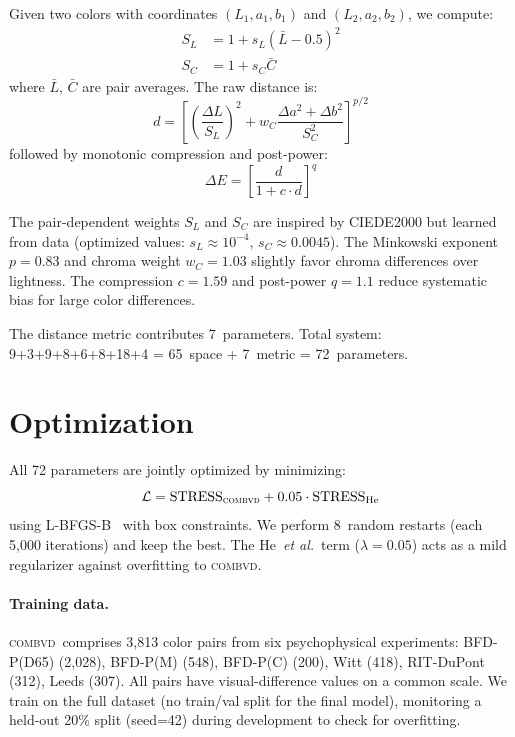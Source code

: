 \documentclass[11pt, twocolumn]{article}
\newcommand{\combvd}{\textsc{combvd}}
\newcommand{\etal}{\textit{et al.}}
\begin{document}
Given two colors with coordinates $(L_1, a_1, b_1)$ and
$(L_2, a_2, b_2)$, we compute:
\begin{align}
  S_L &= 1 + s_L(\bar{L} - 0.5)^2 \label{eq:sl} \\
  S_C &= 1 + s_C \bar{C} \label{eq:sc}
\end{align}
where $\bar{L}$, $\bar{C}$ are pair averages. The raw distance is:
\begin{equation}
  d = \left[\left(\frac{\Delta L}{S_L}\right)^{\!2} + w_C \frac{\Delta a^2 + \Delta b^2}{S_C^2}\right]^{p/2}
  \label{eq:dist_raw}
\end{equation}
followed by monotonic compression and post-power:
\begin{equation}
  \Delta E = \left[\frac{d}{1 + c \cdot d}\right]^q
  \label{eq:dist_final}
\end{equation}

The pair-dependent weights $S_L$ and $S_C$ are inspired by
CIEDE2000 but learned from data (optimized values: $s_L \approx 10^{-4}$,
$s_C \approx 0.0045$). The Minkowski exponent $p = 0.83$ and
chroma weight $w_C = 1.03$ slightly favor chroma differences over
lightness. The compression $c = 1.59$ and post-power $q = 1.1$
reduce systematic bias for large color differences.

The distance metric contributes 7~parameters. Total system:
9+3+9+8+6+8+18+4 = 65~space + 7~metric = 72~parameters.


\section{Optimization}
\label{sec:optimization}

All 72 parameters are jointly optimized by minimizing:
\begin{equation}
  \mathcal{L} = \mathrm{STRESS}_\combvd + 0.05 \cdot \mathrm{STRESS}_\mathrm{He}
  \label{eq:loss}
\end{equation}
using L-BFGS-B~\cite{byrd1995} with box constraints. We perform
8~random restarts (each 5{,}000 iterations) and keep the best. The
He~\etal\ term ($\lambda = 0.05$) acts as a mild regularizer against
overfitting to \combvd.

\paragraph{Training data.}
\combvd\ comprises 3{,}813 color pairs from six psychophysical
experiments: BFD-P(D65) (2{,}028), BFD-P(M) (548), BFD-P(C) (200),
Witt (418), RIT-DuPont (312), Leeds (307). All pairs have visual-difference
values on a common scale. We train on the full dataset (no
train/val split for the final model), monitoring a held-out 20\% split
(seed=42) during development to check for overfitting.
\end{document}
